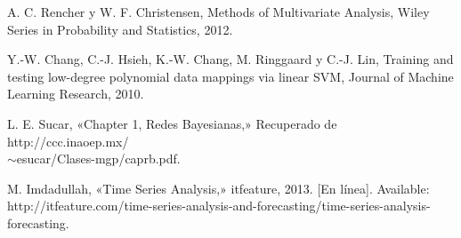 \begin{thebibliography}{a}
	 A. C. Rencher y W. F. Christensen, Methods of Multivariate Analysis, Wiley Series in Probability and Statistics, 2012.

	 Y.-W. Chang, C.-J. Hsieh, K.-W. Chang, M. Ringgaard y C.-J. Lin, Training and testing low-degree
polynomial data mappings via linear SVM, Journal of Machine Learning Research, 2010.
	
	 L. E. Sucar, «Chapter 1, Redes Bayesianas,» Recuperado de
	http://ccc.inaoep.mx/\\$\sim$esucar/Clases-mgp/caprb.pdf. %

	 M. Imdadullah, «Time Series Analysis,» itfeature, 2013. [En línea]. Available:
http://itfeature.com/time-series-analysis-and-forecasting/time-series-analysis-forecasting.

\end{thebibliography}
